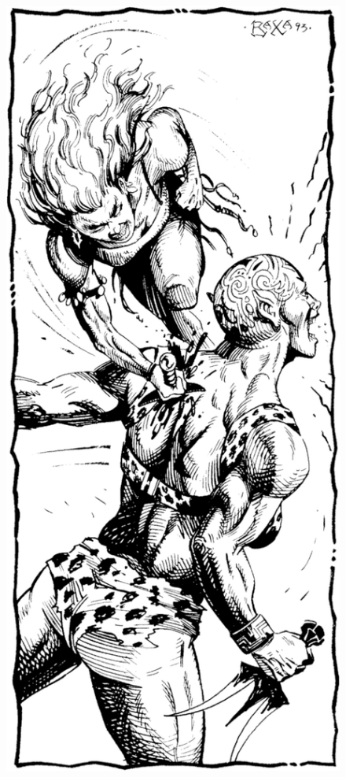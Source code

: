 \begin{figure}[t!]
\centering
\includegraphics[width=\columnwidth-2mm]{images/killing-1.png}
\WOTC
\end{figure}

